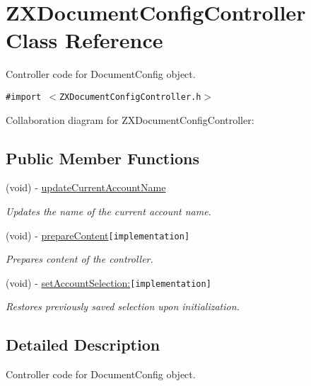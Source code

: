 \hypertarget{interface_z_x_document_config_controller}{
\section{ZXDocumentConfigController Class Reference}
\label{interface_z_x_document_config_controller}
}
Controller code for DocumentConfig object.  


{\tt \#import $<$ZXDocumentConfigController.h$>$}

Collaboration diagram for ZXDocumentConfigController:\subsection*{Public Member Functions}
\begin{CompactItemize}
\item 
(void) - \hyperlink{interface_z_x_document_config_controller_cfa739fc6f986587297a3e69b04e17ac}{updateCurrentAccountName}
\begin{CompactList}\small\item\em Updates the name of the current account name. \item\end{CompactList}\item 
(void) - \hyperlink{interface_z_x_document_config_controller_f60d0ea6edd4aa4301bc2a74c3d42732}{prepareContent}{\tt  \mbox{[}implementation\mbox{]}}
\begin{CompactList}\small\item\em Prepares content of the controller. \item\end{CompactList}\item 
(void) - \hyperlink{interface_z_x_document_config_controller_f5f7cd78bb2445efb332a61bd6151e8e}{setAccountSelection:}{\tt  \mbox{[}implementation\mbox{]}}
\begin{CompactList}\small\item\em Restores previously saved selection upon initialization. \item\end{CompactList}\end{CompactItemize}


\subsection{Detailed Description}
Controller code for DocumentConfig object. 

